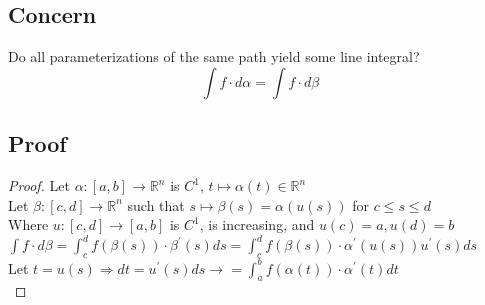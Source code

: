 \documentclass[12pt]{article}
\newcommand{\BR}{\mathbb R}
\newcommand{\prm}{^\prime}
\begin{document}
  \subsection*  {Concern}
    Do all parameterizations of the same path yield some line integral? \\
    \[ \int f\cdot d\alpha=\int f\cdot d\beta \]
  \subsection*{Proof}
    \begin{proof}
      Let $\alpha:[a,b]\rightarrow\BR^n$ is $C^1$, $t\mapsto\alpha(t)\in\BR^n$ \\
      Let $\beta:[c,d]\rightarrow\BR^n$ such that $s\mapsto\beta(s)=\alpha(u(s))$ for $c\leq s\leq d$ \\
      Where $u:[c,d]\rightarrow[a,b]$ is $C^1$, is increasing, and $u(c)=a, u(d)=b$ \\
      $\int f\cdot d\beta=\int_c^d f(\beta(s))\cdot\beta\prm(s)ds=\int_c^df(\beta(s))\cdot\alpha\prm(u(s))u\prm(s)ds$ \\
      Let $t=u(s)\Rightarrow dt=u\prm(s)ds\rightarrow=\int_a^b f(\alpha(t))\cdot\alpha\prm(t)dt$ \\
    \end{proof}
\end{document}
